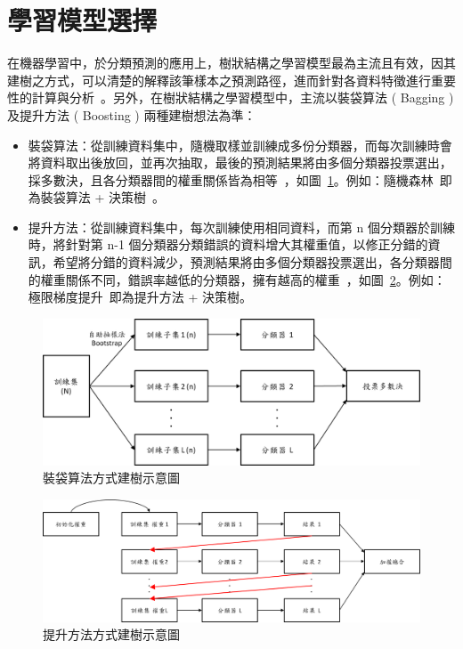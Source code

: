\section{學習模型選擇}

在機器學習中，於分類預測的應用上，樹狀結構之學習模型最為主流且有效，因其建樹之方式，可以清楚的解釋該筆樣本之預測路徑，進而針對各資料特徵進行重要性的計算與分析~\cite{lee2018game}。另外，在樹狀結構之學習模型中，主流以裝袋算法 ( Bagging ) 及提升方法 ( Boosting ) 兩種建樹想法為準：

\begin{itemize}
    \item 裝袋算法：從訓練資料集中，隨機取樣並訓練成多份分類器，而每次訓練時會將資料取出後放回，並再次抽取，最後的預測結果將由多個分類器投票選出，採多數決，且各分類器間的權重關係皆為相等~\cite{breiman1996bagging}，如圖~\ref{fig:Bagging}。例如：隨機森林~\cite{breiman2001random}即為裝袋算法 + 決策樹~\cite{breiman1984classification}。
    \item 提升方法：從訓練資料集中，每次訓練使用相同資料，而第 n 個分類器於訓練時，將針對第 n-1 個分類器分類錯誤的資料增大其權重值，以修正分錯的資訊，希望將分錯的資料減少，預測結果將由多個分類器投票選出，各分類器間的權重關係不同，錯誤率越低的分類器，擁有越高的權重~\cite{freund1999short}，如圖~\ref{fig:Boosting}。例如：極限梯度提升~\cite{chen2016xgboost}即為提升方法 + 決策樹。
\end{itemize}

\begin{figure}[!htb]
    \begin{center}
      \includegraphics[width=1\textwidth]{figures/Image_Bagging.png}
      \caption[裝袋算法方式建樹示意圖]{裝袋算法方式建樹示意圖}
      \label{fig:Bagging}
    \end{center}
\end{figure}

\begin{figure}[!htb]
    \begin{center}
      \includegraphics[width=1\textwidth]{figures/Image_Boosting.png}
      \caption[提升方法方式建樹示意圖]{提升方法方式建樹示意圖}
      \label{fig:Boosting}
    \end{center}
\end{figure}

